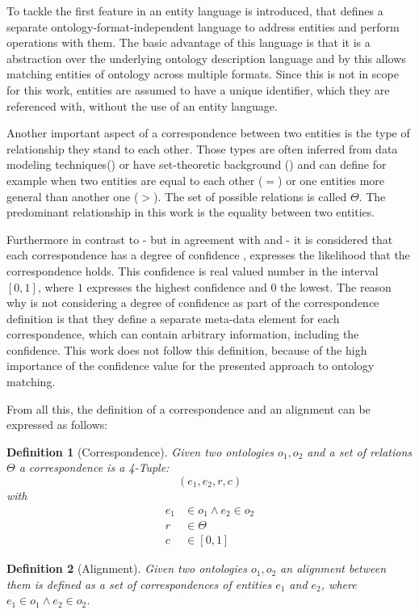 \documentclass[11pt,titlepage,oneside,openany,a4paper]{report}
\newtheorem{definition}{Definition}[chapter]
\begin{document}
To tackle the first feature in \cite{euzenat2013d} an entity language is introduced, that defines a separate ontology-format-independent language to address entities and perform operations with them. The basic advantage of this language is that it is a abstraction over the underlying ontology description language and by this allows matching entities of ontology across multiple formats. Since this is not in scope for this work, entities are assumed to have a unique identifier, which they are referenced with, without the use of an entity language.

Another important aspect of a correspondence between two entities is the type of relationship they stand to each other. Those types are often inferred from data modeling techniques(\cite{Rahm:2001}) or have set-theoretic background (\cite{euzenat2013d}) and can define for example when two entities are equal to each other ($=$) or one entities more general than another one ($>$). The set of possible relations is called $\Theta$. The predominant relationship in this work is the equality between two entities.

Furthermore  in contrast to  \cite{euzenat2013d} - but in agreement with \cite{ehrig2006ontology} and \cite{Rahm:2001}- it is considered that each correspondence has a degree of confidence , expresses the likelihood that the correspondence holds. This confidence is real valued number in the interval $[0,1]$, where $1$ expresses the highest confidence and $0$ the lowest. The reason why \cite{euzenat2013d} is not considering a degree of confidence as part of the correspondence definition is that they define a separate meta-data element for each correspondence, which can contain arbitrary information, including the confidence. This work does not follow this definition, because of the high importance of the confidence value for the presented approach to ontology matching.

From all this, the definition of a correspondence and an alignment can be expressed as follows:
\begin{definition} [Correspondence] Given two ontologies $o_1,o_2$ and a set of relations $\Theta$ a correspondence is a 4-Tuple:
	\begin{equation*}
	(e_1,e_2,r,c)
	\end{equation*}
with
	\begin{eqnarray*}
	e_1 & \in o_1 \wedge  e_2 \in o_2 \\
	r & \in \Theta \\
	c & \in [0,1]
	\end{eqnarray*}
\end{definition}
\begin{definition} [Alignment] Given two ontologies $o_1, o_2$ an alignment between them is defined as a set of correspondences of entities $e_1$ and $e_2$, where $e_1 \in o_1 \wedge e_2 \in o_2$.
\end{definition}
\end{document}
